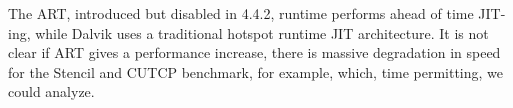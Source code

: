 The ART, introduced but disabled in 4.4.2, runtime performs ahead of
  time JIT-ing, while Dalvik uses a traditional hotspot runtime JIT architecture.
It is not clear if ART gives a performance increase, there is massive degradation
  in speed for the Stencil and CUTCP benchmark, for example, which, time permitting, we could
  analyze.

\begin{figure}%
    \centering
    ~
    \\
    ~
    \\

\end{figure}
